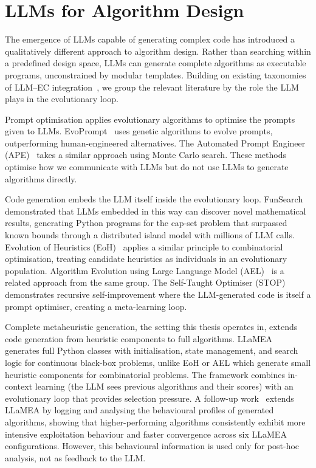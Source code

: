 \section{LLMs for Algorithm Design}
\label{sec:bg-llm-aad}

The emergence of LLMs capable of generating complex code has introduced a qualitatively different approach to algorithm design. Rather than searching within a predefined design space, LLMs can generate complete algorithms as executable programs, unconstrained by modular templates. Building on existing taxonomies of LLM--EC integration~\cite{vanStein2024LLaMEA,chauhan2025ecllmsurvey}, we group the relevant literature by the role the LLM plays in the evolutionary loop.

Prompt optimisation applies evolutionary algorithms to optimise the prompts given to LLMs. EvoPrompt~\cite{guo2024evoprompt} uses genetic algorithms to evolve prompts, outperforming human-engineered alternatives. The Automated Prompt Engineer (APE)~\cite{zhou2023ape} takes a similar approach using Monte Carlo search. These methods optimise how we communicate with LLMs but do not use LLMs to generate algorithms directly.

Code generation embeds the LLM itself inside the evolutionary loop. FunSearch~\cite{romeraparedes2024funsearch} demonstrated that LLMs embedded in this way can discover novel mathematical results, generating Python programs for the cap-set problem that surpassed known bounds through a distributed island model with millions of LLM calls. Evolution of Heuristics (EoH)~\cite{liu2024eoh} applies a similar principle to combinatorial optimisation, treating candidate heuristics as individuals in an evolutionary population. Algorithm Evolution using Large Language Model (AEL)~\cite{liu2023ael} is a related approach from the same group. The Self-Taught Optimiser (STOP)~\cite{zelikman2024stop} demonstrates recursive self-improvement where the LLM-generated code is itself a prompt optimiser, creating a meta-learning loop.

Complete metaheuristic generation, the setting this thesis operates in, extends code generation from heuristic components to full algorithms. LLaMEA~\cite{vanStein2024LLaMEA} generates full Python classes with initialisation, state management, and search logic for continuous black-box problems, unlike EoH or AEL which generate small heuristic components for combinatorial problems. The framework combines in-context learning (the LLM sees previous algorithms and their scores) with an evolutionary loop that provides selection pressure. A follow-up work~\cite{vanStein2025Behaviour} extends LLaMEA by logging and analysing the behavioural profiles of generated algorithms, showing that higher-performing algorithms consistently exhibit more intensive exploitation behaviour and faster convergence across six LLaMEA configurations. However, this behavioural information is used only for post-hoc analysis, not as feedback to the LLM.

